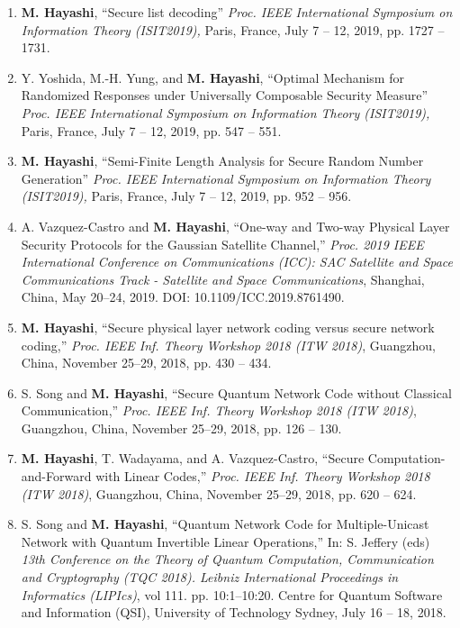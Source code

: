 \documentclass[a4paper,12pt,oneside]{article}
\begin{document}
\begin{enumerate}
\item 
\textbf{M. Hayashi}, 
``Secure list decoding'' 
{\em Proc. IEEE International Symposium on Information Theory (ISIT2019),} 
Paris, France, July 7 -- 12, 2019, pp. 1727 -- 1731. 

\item 
Y. Yoshida, M.-H. Yung, and \textbf{M. Hayashi}, 
``Optimal Mechanism for Randomized Responses under Universally Composable Security Measure'' 
{\em Proc. IEEE International Symposium on Information Theory (ISIT2019),} 
Paris, France, July 7 -- 12, 2019, pp. 547 -- 551. 

\item 
\textbf{M. Hayashi}, 
``Semi-Finite Length Analysis for Secure Random Number Generation'' 
{\em Proc. IEEE International Symposium on Information Theory (ISIT2019),} 
Paris, France, July 7 -- 12, 2019, pp. 952 -- 956. 

\item 
A. Vazquez-Castro and \textbf{M. Hayashi}, 
``One-way and Two-way Physical Layer Security Protocols for the Gaussian Satellite Channel,'' 
{\em Proc. 2019 IEEE International Conference on Communications (ICC): SAC Satellite and Space Communications Track - Satellite and Space Communications},
Shanghai, China, May 20--24, 2019. DOI: 10.1109/ICC.2019.8761490.

\item 
\textbf{M. Hayashi}, 
``Secure physical layer network coding versus secure network coding,''
{\em Proc. IEEE Inf. Theory Workshop 2018 (ITW 2018)}, 
Guangzhou, China, November 25--29, 2018, pp. 430 -- 434. 

\item 
S. Song and \textbf{M. Hayashi}, 
``Secure Quantum Network Code without Classical Communication,''
{\em Proc. IEEE Inf. Theory Workshop 2018 (ITW 2018)}, 
Guangzhou, China, November 25--29, 2018, pp. 126 -- 130. 

\item 
\textbf{M. Hayashi}, T. Wadayama, and A. Vazquez-Castro,
``Secure Computation-and-Forward with Linear Codes,''
{\em Proc. IEEE Inf. Theory Workshop 2018 (ITW 2018)}, 
Guangzhou, China, November 25--29, 2018, pp. 620 -- 624. 

\item 
S. Song and \textbf{M. Hayashi}, 
``Quantum Network Code for Multiple-Unicast Network with Quantum Invertible Linear Operations,''
In: S. Jeffery (eds) 
{\em 13th Conference on the Theory of Quantum Computation, Communication and Cryptography (TQC 2018). Leibniz International Proceedings in Informatics (LIPIcs)},
 vol 111. pp. 10:1--10:20.
Centre for Quantum Software and Information (QSI), University of Technology Sydney, 
July 16 -- 18, 2018.


\end{enumerate}
\end{document}
